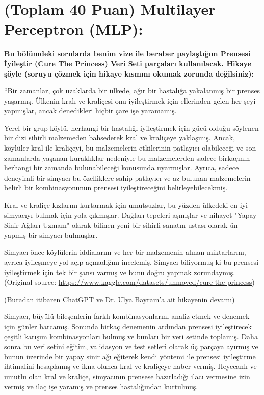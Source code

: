 \documentclass[11pt]{article}
\begin{document}
\section{(Toplam 40 Puan) Multilayer Perceptron (MLP):} 
\textbf{Bu bölümdeki sorularda benim vize ile beraber paylaştığım Prensesi İyileştir (Cure The Princess) Veri Seti parçaları kullanılacak. Hikaye şöyle (soruyu çözmek için hikaye kısmını okumak zorunda değilsiniz):} 

``Bir zamanlar, çok uzaklarda bir ülkede, ağır bir hastalığa yakalanmış bir prenses yaşarmış. Ülkenin kralı ve kraliçesi onu iyileştirmek için ellerinden gelen her şeyi yapmışlar, ancak denedikleri hiçbir çare işe yaramamış.

Yerel bir grup köylü, herhangi bir hastalığı iyileştirmek için gücü olduğu söylenen bir dizi sihirli malzemeden bahsederek kral ve kraliçeye yaklaşmış. Ancak, köylüler kral ile kraliçeyi, bu malzemelerin etkilerinin patlayıcı olabileceği ve son zamanlarda yaşanan kuraklıklar nedeniyle bu malzemelerden sadece birkaçının herhangi bir zamanda bulunabileceği konusunda uyarmışlar. Ayrıca, sadece deneyimli bir simyacı bu özelliklere sahip patlayıcı ve az bulunan malzemelerin belirli bir kombinasyonunun prensesi iyileştireceğini belirleyebilecekmiş.

Kral ve kraliçe kızlarını kurtarmak için umutsuzlar, bu yüzden ülkedeki en iyi simyacıyı bulmak için yola çıkmışlar. Dağları tepeleri aşmışlar ve nihayet "Yapay Sinir Ağları Uzmanı" olarak bilinen yeni bir sihirli sanatın ustası olarak ün yapmış bir simyacı bulmuşlar.

Simyacı önce köylülerin iddialarını ve her bir malzemenin alınan miktarlarını, ayrıca iyileşmeye yol açıp açmadığını incelemiş. Simyacı biliyormuş ki bu prensesi iyileştirmek için tek bir şansı varmış ve bunu doğru yapmak zorundaymış. (Original source: \url{https://www.kaggle.com/datasets/unmoved/cure-the-princess})

(Buradan itibaren ChatGPT ve Dr. Ulya Bayram'a ait hikayenin devamı)

Simyacı, büyülü bileşenlerin farklı kombinasyonlarını analiz etmek ve denemek için günler harcamış. Sonunda birkaç denemenin ardından prensesi iyileştirecek çeşitli karışım kombinasyonları bulmuş ve bunları bir veri setinde toplamış. Daha sonra bu veri setini eğitim, validasyon ve test setleri olarak üç parçaya ayırmış ve bunun üzerinde bir yapay sinir ağı eğiterek kendi yöntemi ile prensesi iyileştirme ihtimalini hesaplamış ve ikna olunca kral ve kraliçeye haber vermiş. Heyecanlı ve umutlu olan kral ve kraliçe, simyacının prensese hazırladığı ilacı vermesine izin vermiş ve ilaç işe yaramış ve prenses hastalığından kurtulmuş.
\end{document}
